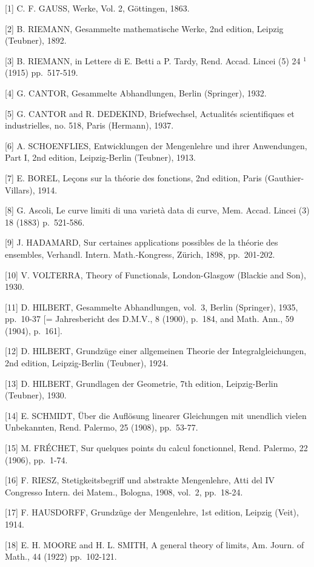 {[}1{]} C. F. GAUSS, Werke, Vol. 2, Göttingen, 1863.

{[}2{]} B. RIEMANN, Gesammelte mathematische Werke, 2nd edition, Leipzig (Teubner), 1892.

{[}3{]} B. RIEMANN, in Lettere di E. Betti a P. Tardy, Rend. Accad. Lincei (5) 24 \(^{1}\) (1915) pp.~517-519.

{[}4{]} G. CANTOR, Gesammelte Abhandlungen, Berlin (Springer), 1932.

{[}5{]} G. CANTOR and R. DEDEKIND, Briefwechsel, Actualités scientifiques et industrielles, no. 518, Paris (Hermann), 1937.

{[}6{]} A. SCHOENFLIES, Entwicklungen der Mengenlehre und ihrer Anwendungen, Part I, 2nd edition, Leipzig-Berlin (Teubner), 1913.

{[}7{]} E. BOREL, Leçons sur la théorie des fonctions, 2nd edition, Paris (Gauthier-Villars), 1914.

{[}8{]} G. Ascoli, Le curve limiti di una varietà data di curve, Mem. Accad. Lincei (3) 18 (1883) p.~521-586.

{[}9{]} J. HADAMARD, Sur certaines applications possibles de la théorie des ensembles, Verhandl. Intern. Math.-Kongress, Zürich, 1898, pp.~201-202.

{[}10{]} V. VOLTERRA, Theory of Functionals, London-Glasgow (Blackie and Son), 1930.

{[}11{]} D. HILBERT, Gesammelte Abhandlungen, vol.~3, Berlin (Springer), 1935, pp.~10-37 {[}= Jahresbericht des D.M.V., 8 (1900), p.~184, and Math. Ann., 59 (1904), p.~161{]}.

{[}12{]} D. HILBERT, Grundzüge einer allgemeinen Theorie der Integralgleichungen, 2nd edition, Leipzig-Berlin (Teubner), 1924.

{[}13{]} D. HILBERT, Grundlagen der Geometrie, 7th edition, Leipzig-Berlin (Teubner), 1930.

{[}14{]} E. SCHMIDT, Über die Auflösung linearer Gleichungen mit unendlich vielen Unbekannten, Rend. Palermo, 25 (1908), pp.~53-77.

{[}15{]} M. FRÉCHET, Sur quelques points du calcul fonctionnel, Rend. Palermo, 22 (1906), pp.~1-74.

{[}16{]} F. RIESZ, Stetigkeitsbegriff und abstrakte Mengenlehre, Atti del IV Congresso Intern. dei Matem., Bologna, 1908, vol.~2, pp.~18-24.

{[}17{]} F. HAUSDORFF, Grundzüge der Mengenlehre, 1st edition, Leipzig (Veit), 1914.

{[}18{]} E. H. MOORE and H. L. SMITH, A general theory of limits, Am. Journ. of Math., 44 (1922) pp.~102-121.

